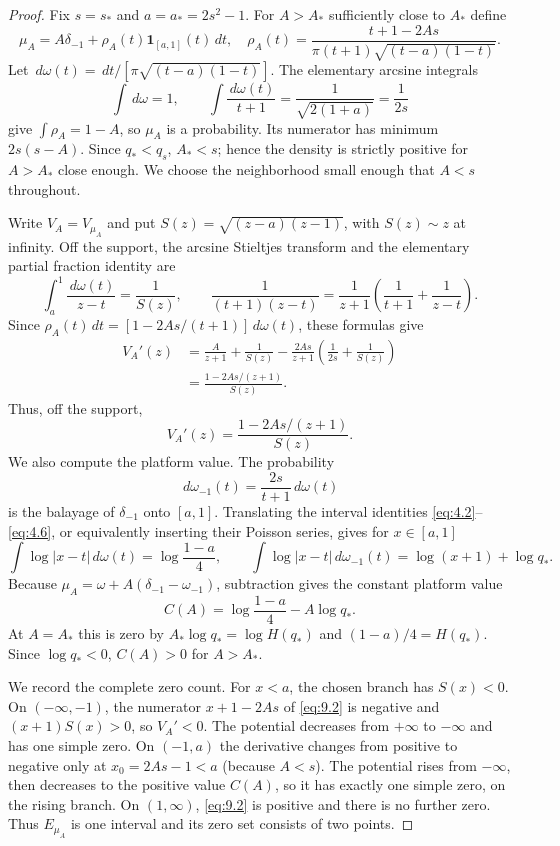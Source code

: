 \documentclass[11pt]{article}
\numberwithin{equation}{section}
\theoremstyle{plain}
\theoremstyle{definition}
\theoremstyle{remark}
\newcommand{\1}{\mathbf 1}
\newcommand{\dd}{\,d}
\begin{document}
\begin{proof}
Fix $s=s_*$ and $a=a_*=2s^2-1$.  For $A>A_*$ sufficiently close to
$A_*$ define
\[
 \mu_A=A\delta_{-1}+
 \rho_A(t)\1_{[a,1]}(t)\dd t,
\quad
 \rho_A(t)=\frac{t+1-2As}
 {\pi(t+1)\sqrt{(t-a)(1-t)}}.
\]
Let $\dd\omega(t)=\dd t/[\pi\sqrt{(t-a)(1-t)}]$.  The elementary arcsine
integrals
\[
 \int \dd\omega=1,\qquad
 \int\frac{\dd\omega(t)}{t+1}
 =\frac1{\sqrt{2(1+a)}}=\frac1{2s}
\]
give $\int\rho_A=1-A$, so $\mu_A$ is a probability.  Its numerator has
minimum $2s(s-A)$.  Since $q_*<q_s$, $A_*<s$; hence the density is strictly
positive for $A>A_*$ close enough.  We choose the neighborhood small enough
that $A<s$ throughout.

Write $V_A=V_{\mu_A}$ and put
$S(z)=\sqrt{(z-a)(z-1)}$, with $S(z)\sim z$ at infinity.  Off the
support, the arcsine Stieltjes transform and the elementary partial
fraction identity are
\[
 \int_a^1\frac{\dd\omega(t)}{z-t}=\frac1{S(z)},\qquad
 \frac1{(t+1)(z-t)}=\frac1{z+1}
 \left(\frac1{t+1}+\frac1{z-t}\right).
\]
Since $\rho_A(t)\dd t=[1-2As/(t+1)]\dd\omega(t)$, these formulas give
\begin{align*}
V_A'(z)
&=\frac A{z+1}+\frac1{S(z)}
-\frac{2As}{z+1}\left(\frac1{2s}+\frac1{S(z)}\right)\\
&=\frac{1-2As/(z+1)}{S(z)}.
\end{align*}
Thus, off the support,
\begin{equation}
 V_A'(z)=\frac{1-2As/(z+1)}{S(z)}.
\label{eq:9.2}
\end{equation}
We also compute the platform value.  The probability
\[
 \dd\omega_{-1}(t)=\frac{2s}{t+1}\dd\omega(t)
\]
is the balayage of $\delta_{-1}$ onto $[a,1]$.  Translating the interval
identities \eqref{eq:4.2}--\eqref{eq:4.6}, or equivalently inserting their Poisson series,
gives for $x\in[a,1]$
\[
 \int\log|x-t|\dd\omega(t)=\log\frac{1-a}{4},\qquad
 \int\log|x-t|\dd\omega_{-1}(t)=\log(x+1)+\log q_*.
\]
Because $\mu_A=\omega+A(\delta_{-1}-\omega_{-1})$, subtraction gives the
constant platform value
\begin{equation}
 C(A)=\log\frac{1-a}{4}-A\log q_*.
\label{eq:9.3}
\end{equation}
At $A=A_*$ this is zero by $A_*\log q_*=\log H(q_*)$ and
$(1-a)/4=H(q_*)$.  Since $\log q_*<0$, $C(A)>0$ for $A>A_*$.

We record the complete zero count.  For $x<a$, the chosen branch has
$S(x)<0$.  On $(-\infty,-1)$, the numerator $x+1-2As$ of \eqref{eq:9.2} is
negative and $(x+1)S(x)>0$, so $V_A'<0$.  The potential decreases from
$+\infty$ to $-\infty$ and has one simple zero.  On $(-1,a)$ the
derivative changes from positive to negative only at $x_0=2As-1<a$
(because $A<s$).  The potential rises from $-\infty$, then decreases to
the positive value $C(A)$, so it has exactly one simple zero, on the rising
branch.  On $(1,\infty)$, \eqref{eq:9.2} is positive and there is no further zero.
Thus $E_{\mu_A}$ is one interval and its zero set consists of two points.


\end{proof}
\end{document}
